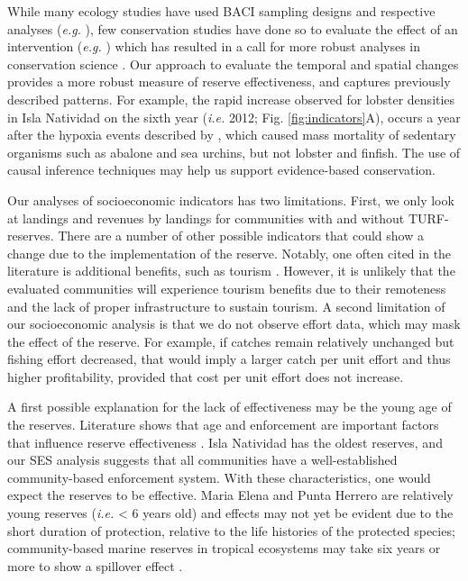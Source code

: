 \documentclass{frontiersSCNS}
\begin{document}
While many ecology studies have used BACI sampling designs and
respective analyses (\emph{e.g.} \citet{stewartoaten_1986}), few
conservation studies have done so to evaluate the effect of an
intervention (\emph{e.g.}
\citet{francinifilho_2008,lester_2009,moland_2013}) which has resulted
in a call for more robust analyses in conservation science
\citep{guidetti_2002,ferraro_2006}. Our approach to evaluate the
temporal and spatial changes provides a more robust measure of reserve
effectiveness, and captures previously described patterns. For example,
the rapid increase observed for lobster densities in Isla Natividad on
the sixth year (\emph{i.e.} 2012; Fig. \ref{fig:indicators}A), occurs a
year after the hypoxia events described by \citet{micheli_2012-EU},
which caused mass mortality of sedentary organisms such as abalone and
sea urchins, but not lobster and finfish. The use of causal inference
techniques may help us support evidence-based conservation.

Our analyses of socioeconomic indicators has two limitations. First, we
only look at landings and revenues by landings for communities with and
without TURF-reserves. There are a number of other possible indicators
that could show a change due to the implementation of the reserve.
Notably, one often cited in the literature is additional benefits, such
as tourism \citep{viana_2017}. However, it is unlikely that the
evaluated communities will experience tourism benefits due to their
remoteness and the lack of proper infrastructure to sustain tourism. A
second limitation of our socioeconomic analysis is that we do not
observe effort data, which may mask the effect of the reserve. For
example, if catches remain relatively unchanged but fishing effort
decreased, that would imply a larger catch per unit effort and thus
higher profitability, provided that cost per unit effort does not
increase.

A first possible explanation for the lack of effectiveness may be the
young age of the reserves. Literature shows that age and enforcement are
important factors that influence reserve effectiveness
\citep{edgar_2014-UO,babcock_2010}. Isla Natividad has the oldest
reserves, and our SES analysis suggests that all communities have a
well-established community-based enforcement system. With these
characteristics, one would expect the reserves to be effective. Maria
Elena and Punta Herrero are relatively young reserves (\emph{i.e.}
\textless{} 6 years old) and effects may not yet be evident due to the
short duration of protection, relative to the life histories of the
protected species; community-based marine reserves in tropical
ecosystems may take six years or more to show a spillover effect
\citep{dasilva_2015-zX}.
\end{document}
